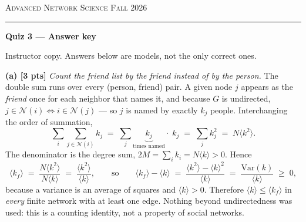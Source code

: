 \documentclass[a4paper, 11pt]{extarticle}
\begin{document}
{\footnotesize\textsc{Advanced Network Science} \hfill \textsc{Fall 2026}}\par
\vspace{-0.2em}\rule{\textwidth}{1pt}\par
\vspace{0.3em}
{\LARGE\bfseries Quiz 3 \; --- \; Answer key}\par
\vspace{0.1em}
{\small Instructor copy. Answers below are models, not the only correct ones.}\par
\vspace{0.8em}


\textbf{(a) [3 pts]} \emph{Count the friend list by the friend instead of by
the person.} The double sum runs over every (person, friend) pair. A given
node $j$ appears as the \emph{friend} once for each neighbor that names it,
and because $G$ is undirected, $j \in \mathcal{N}(i) \iff i \in \mathcal{N}(j)$
--- so $j$ is named by exactly $k_j$ people. Interchanging the order of
summation,
\[
  \sum_{i} \sum_{j \in \mathcal{N}(i)} k_j
  \;=\; \sum_{j} \underbrace{k_j}_{\text{times named}} \cdot\; k_j
  \;=\; \sum_{j} k_j^2 \;=\; N \langle k^2 \rangle .
\]
The denominator is the degree sum, $2M = \sum_i k_i = N \langle k \rangle > 0$.
Hence
\[
  \langle k_f \rangle \;=\; \frac{N \langle k^2 \rangle}{N \langle k \rangle}
  \;=\; \frac{\langle k^2 \rangle}{\langle k \rangle} ,
  \qquad\text{so}\qquad
  \langle k_f \rangle - \langle k \rangle
  \;=\; \frac{\langle k^2 \rangle - \langle k \rangle^2}{\langle k \rangle}
  \;=\; \frac{\mathrm{Var}(k)}{\langle k \rangle} \;\ge\; 0 ,
\]
because a variance is an average of squares and $\langle k \rangle > 0$.
Therefore $\langle k \rangle \le \langle k_f \rangle$ in \emph{every} finite
network with at least one edge. Nothing beyond undirectedness was used: this
is a counting identity, not a property of social networks.
\end{document}
